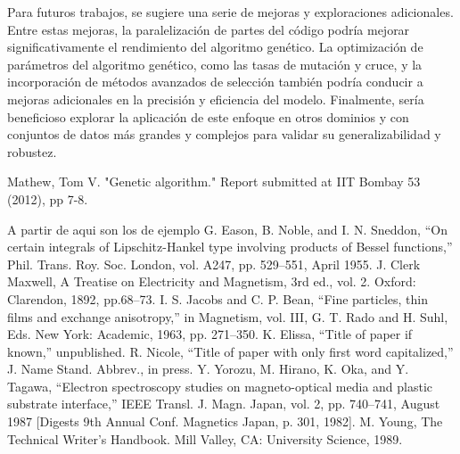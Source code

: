 \documentclass[conference,a4paper]{IEEEtran}
\begin{document}
Para futuros trabajos, se sugiere una serie de mejoras y exploraciones adicionales. Entre estas mejoras, la paralelización de partes del código podría mejorar significativamente el rendimiento del algoritmo genético. La optimización de parámetros del algoritmo genético, como las tasas de mutación y cruce, y la incorporación de métodos avanzados de selección también podría conducir a mejoras adicionales en la precisión y eficiencia del modelo. Finalmente, sería beneficioso explorar la aplicación de este enfoque en otros dominios y con conjuntos de datos más grandes y complejos para validar su generalizabilidad y robustez.



\begin{thebibliography}{00}
Mathew, Tom V. "Genetic algorithm." Report submitted at IIT Bombay 53 (2012), pp 7-8.


A partir de aqui son los de ejemplo
 G. Eason, B. Noble, and I. N. Sneddon, ``On certain integrals of Lipschitz-Hankel type involving products of Bessel functions,'' Phil. Trans. Roy. Soc. London, vol. A247, pp. 529--551, April 1955.
 J. Clerk Maxwell, A Treatise on Electricity and Magnetism, 3rd ed., vol. 2. Oxford: Clarendon, 1892, pp.68--73.
 I. S. Jacobs and C. P. Bean, ``Fine particles, thin films and exchange anisotropy,'' in Magnetism, vol. III, G. T. Rado and H. Suhl, Eds. New York: Academic, 1963, pp. 271--350.
 K. Elissa, ``Title of paper if known,'' unpublished.
 R. Nicole, ``Title of paper with only first word capitalized,'' J. Name Stand. Abbrev., in press.
 Y. Yorozu, M. Hirano, K. Oka, and Y. Tagawa, ``Electron spectroscopy studies on magneto-optical media and plastic substrate interface,'' IEEE Transl. J. Magn. Japan, vol. 2, pp. 740--741, August 1987 [Digests 9th Annual Conf. Magnetics Japan, p. 301, 1982].
 M. Young, The Technical Writer's Handbook. Mill Valley, CA: University Science, 1989.
\end{thebibliography}
\end{document}
